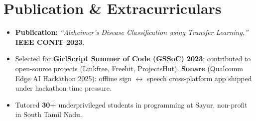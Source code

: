 \documentclass[letterpaper,10pt]{article}
\begin{document}
\section{Publication \& Extracurriculars}
\begin{itemize}[leftmargin=0.18in, itemsep=0pt, topsep=1pt]
  \item\small \textbf{Publication:} \textit{``Alzheimer's Disease Classification using Transfer Learning,''} \textbf{IEEE CONIT 2023}.
  \item\small Selected for \textbf{GirlScript Summer of Code (GSSoC) 2023}; contributed to open-source projects (Linkfree, Freehit, ProjectsHut). \textbf{Sonare} (Qualcomm Edge AI Hackathon 2025): offline sign $\leftrightarrow$ speech cross-platform app shipped under hackathon time pressure.
  \item\small Tutored \textbf{30+} underprivileged students in programming at Sayur, non-profit in South Tamil Nadu.
\end{itemize}
\vspace{-6pt}
\end{document}
